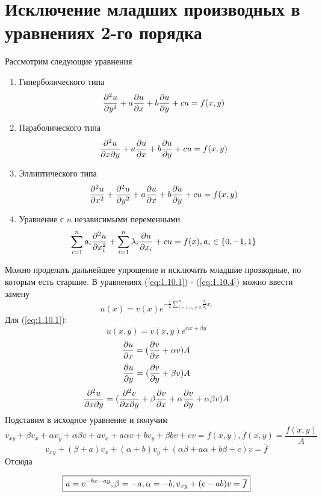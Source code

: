 \documentclass[../main.tex]{subfiles}
\begin{document}
\section{Исключение младших производных в уравнениях 2-го порядка}
Рассмотрим следующие уравнения
{\bf
\begin{enumerate}
	\item Гиперболического типа
	      \begin{equation} \label{eq:1.10.1}
		      \frac{\partial ^2 u}{\partial y^2} + a \frac{\partial u}{\partial x} + b \frac{\partial u}{\partial y} + cu = f(x, y)
	      \end{equation}
	\item Параболического типа
	      \begin{equation} \label{eq:1.10.2}
		      \frac{\partial ^2 u}{\partial x \partial y} + a \frac{\partial u}{\partial x} + b \frac{\partial u}{\partial y} + cu = f(x, y)
	      \end{equation}
	\item Эллиптического типа
	      \begin{equation} \label{eq:1.10.3}
		      \frac{\partial ^2 u}{\partial x^2} + \frac{\partial^2 u}{\partial y^2} + a \frac{\partial u}{\partial x} + b \frac{\partial u}{\partial y} + cu = f(x, y)
	      \end{equation}
	\item Уравнение с $n$ независимыми переменными
	      \begin{equation} \label{eq:1.10.4}
		      \sum_{i=1}^n a_i \frac{\partial^2 u }{\partial x_i^2} + \sum_{i=1}^n \lambda_i \frac{\partial u}{\partial x_i} + cu = f(x), a_i \in \{0, -1, 1\}
	      \end{equation}
\end{enumerate}}
Можно проделать дальнейшее упрощение и исключить младшие прозводные, по которым есть старшие.
В уравнениях (\ref{eq:1.10.1}) - (\ref{eq:1.10.4}) можно ввести замену
$$u(x) = v(x)e^{-\frac{1}{2} \sum \limits_{i=1, a_i \neq 0}^n \frac{\lambda_i}{a_i} x_i}$$
Для (\ref{eq:1.10.1}):
$$u(x,y) = v(x,y) e ^ {\alpha x + \beta y}$$
$$\frac{\partial u}{\partial x} = (\frac{\partial v}{\partial x}+\alpha v)A$$
$$\frac{\partial u}{\partial y} = (\frac{\partial v}{\partial y}+\beta v)A$$
$$\frac{\partial^2 u}{\partial x \partial y} = (\frac{\partial^2 v}{\partial x \partial y} + \beta \frac{\partial v}{\partial x} + \alpha \frac{\partial v}{\partial y} + \alpha \beta v)A$$
Подставим в исходное уравнение и получим
$$v_{xy} + \beta v_x + \alpha v_y + \alpha \beta v + a v_x + a \alpha v + b v_y + \beta b v + cv = \overline{f}(x,y), \overline{f}(x,y) = \frac{f(x,y)}{A}$$
$$v_{xy} + (\beta + a)v_x + (\alpha + b)v_y + (\alpha \beta + a \alpha + b \beta + c)v = \overline{f}$$
Отсюда

\begin{equation*}
	\boxed{
		u = v^{-bx - ay}, \\
		\beta = -a, \alpha = -b,\\
		v_{xy} + (c-ab)v = \overline{f}
	}
\end{equation*}
\end{document}
